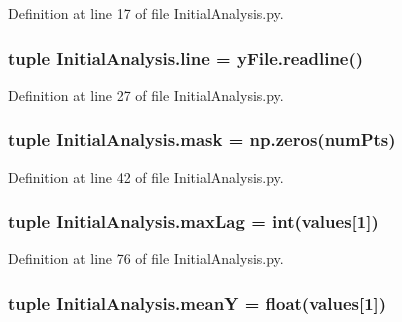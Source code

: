 Definition at line 17 of file Initial\-Analysis.\-py.

\hypertarget{namespace_initial_analysis_aad933de026342605b321bfd95c96ded8}{
\subsubsection[{line}]{\setlength{\rightskip}{0pt plus 5cm}tuple Initial\-Analysis.\-line = y\-File.\-readline()}}\label{namespace_initial_analysis_aad933de026342605b321bfd95c96ded8}


Definition at line 27 of file Initial\-Analysis.\-py.

\hypertarget{namespace_initial_analysis_a55e93475209de46d06fbb68551aba3de}{
\subsubsection[{mask}]{\setlength{\rightskip}{0pt plus 5cm}tuple Initial\-Analysis.\-mask = np.\-zeros({\bf num\-Pts})}}\label{namespace_initial_analysis_a55e93475209de46d06fbb68551aba3de}


Definition at line 42 of file Initial\-Analysis.\-py.

\hypertarget{namespace_initial_analysis_a4c72105d2ca5ecffdfd26e4eddedcccc}{
\subsubsection[{max\-Lag}]{\setlength{\rightskip}{0pt plus 5cm}tuple Initial\-Analysis.\-max\-Lag = int({\bf values}\mbox{[}1\mbox{]})}}\label{namespace_initial_analysis_a4c72105d2ca5ecffdfd26e4eddedcccc}


Definition at line 76 of file Initial\-Analysis.\-py.

\hypertarget{namespace_initial_analysis_a6d2496bd9b370387ae27a7bb0a876c2a}{
\subsubsection[{mean\-Y}]{\setlength{\rightskip}{0pt plus 5cm}tuple Initial\-Analysis.\-mean\-Y = float({\bf values}\mbox{[}1\mbox{]})}}\label{namespace_initial_analysis_a6d2496bd9b370387ae27a7bb0a876c2a}


